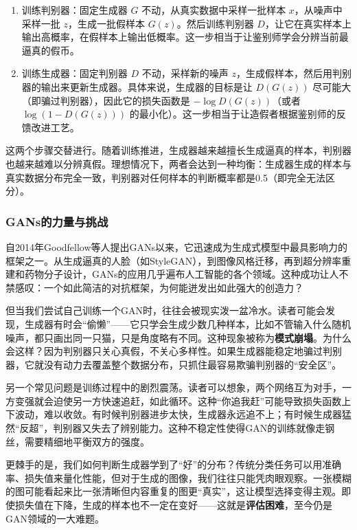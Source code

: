 \documentclass[lang=cn,zihao=-4,a4paper,fontset=windows]{beautybook}
\begin{document}
\begin{enumerate}
    \item 训练判别器：固定生成器 \(G\) 不动，从真实数据中采样一批样本 \(x\)，从噪声中采样一批 \(z\)，生成一批假样本 \(G(z)\)。然后训练判别器 \(D\)，让它在真实样本上输出高概率，在假样本上输出低概率。这一步相当于让鉴别师学会分辨当前最逼真的假币。
    \item 训练生成器：固定判别器 \(D\) 不动，采样新的噪声 \(z\)，生成假样本，然后用判别器的输出来更新生成器。具体来说，生成器的目标是让 \(D(G(z))\) 尽可能大（即骗过判别器），因此它的损失函数是 \(-\log D(G(z))\)（或者 \(\log(1-D(G(z)))\) 的最小化）。这一步相当于让造假者根据鉴别师的反馈改进工艺。
\end{enumerate}
这两个步骤交替进行。随着训练推进，生成器越来越擅长生成逼真的样本，判别器也越来越难以分辨真假。理想情况下，两者会达到一种均衡：生成器生成的样本与真实数据分布完全一致，判别器对任何样本的判断概率都是0.5（即完全无法区分）。

\subsubsection*{GANs的力量与挑战}

自2014年Goodfellow等人提出GANs以来，它迅速成为生成式模型中最具影响力的框架之一。从生成逼真的人脸（如StyleGAN），到图像风格迁移，再到超分辨率重建和药物分子设计，GANs的应用几乎遍布人工智能的各个领域。这种成功让人不禁感叹：一个如此简洁的对抗框架，为何能迸发出如此强大的创造力？

但当我们尝试自己训练一个GAN时，往往会被现实泼一盆冷水。读者可能会发现，生成器有时会“偷懒”——它只学会生成少数几种样本，比如不管输入什么随机噪声，都只画出同一只猫，只是角度略有不同。这种现象被称为\textbf{模式崩塌}。为什么会这样？因为判别器只关心真假，不关心多样性。如果生成器能稳定地骗过判别器，它就没有动力去覆盖整个数据分布，只抓住最容易欺骗判别器的“安全区”。

另一个常见问题是训练过程中的剧烈震荡。读者可以想象，两个网络互为对手，一方变强就会迫使另一方快速追赶，如此循环。这种“你追我赶”可能导致损失函数上下波动，难以收敛。有时候判别器进步太快，生成器永远追不上；有时候生成器猛然“反超”，判别器又失去了辨别能力。这种不稳定性使得GAN的训练就像走钢丝，需要精细地平衡双方的强度。

更棘手的是，我们如何判断生成器学到了“好”的分布？传统分类任务可以用准确率、损失值来量化性能，但对于生成的图像，我们往往只能凭肉眼观察。一张模糊的图可能看起来比一张清晰但内容重复的图更“真实”，这让模型选择变得主观。即使损失值在下降，生成的样本也不一定在变好——这就是\textbf{评估困难}，至今仍是GAN领域的一大难题。
\end{document}
